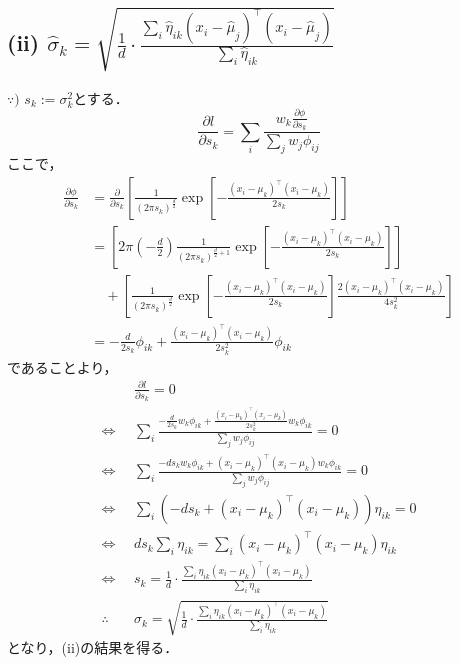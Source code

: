 \documentclass[11pt,a4paper,dvipdfmx]{article}
\theoremstyle{plain}
\renewcommand{\hat}{\widehat}
\newcommand{\equi}{\Longleftrightarrow}
\newcommand{\1}{\mbox{1}\hspace{-0.25em}\mbox{l}}
\begin{document}
\subsection*{(ii) $\hat{\sigma}_k = \sqrt{\frac{1}{d} \cdot \frac{\sum_i \hat{\eta}_{ik} (x_i - \hat{\mu}_j)^\top (x_i - \hat{\mu}_j)}{\sum_i \hat{\eta}_{ik}}}$}
$\because)$
$s_k := \sigma_k^2$とする．
\begin{equation*}
	\frac{\partial l}{\partial s_k} = \sum_i
	\frac{w_k \frac{\partial \phi}{\partial s_k}}{\sum_j w_j \phi_{ij}}
\end{equation*}
ここで，
\begin{align*}
	\frac{\partial \phi}{\partial s_k}
	&= \frac{\partial}{\partial s_k} \left[
	\frac{1}{(2 \pi s_k)^{\frac{d}{2}}} \exp \left[ - \frac{(x_i - \mu_k)^\top (x_i - \mu_k)}{2 s_k} \right]
	\right] \\
	&= \left[ 2 \pi \left( -\frac{d}{2}\right)
	\frac{1}{(2 \pi s_k)^{\frac{d}{2} + 1}} \exp \left[ - \frac{(x_i - \mu_k)^\top (x_i - \mu_k)}{2 s_k} \right]
	\right] \\
	& \quad + 
	\left[
	\frac{1}{(2 \pi s_k)^{\frac{d}{2}}} \exp \left[ - \frac{(x_i - \mu_k)^\top (x_i - \mu_k)}{2 s_k} \right] \frac{2(x_i - \mu_k)^\top (x_i - \mu_k)}{4 s_k^2}
	\right]
	\nonumber \\
	&= - \frac{d}{2s_k}\phi_{ik} + \frac{(x_i - \mu_k)^\top (x_i - \mu_k)}{2 s_k^2} \phi_{ik}
\end{align*}
であることより，
\begin{align*}
	&\frac{\partial l}{\partial s_k} = 0 \\
	\equi &\sum_i \frac{- \frac{d}{2s_k}w_k \phi_{ik} + \frac{(x_i - \mu_k)^\top (x_i - \mu_k)}{2 s_k^2} w_k \phi_{ik}}{\sum_j w_j \phi_{ij}} = 0 \\
	\equi &\sum_i \frac{- d s_k w_k \phi_{ik} + (x_i - \mu_k)^\top (x_i - \mu_k) w_k \phi_{ik}}{\sum_j w_j \phi_{ij}} = 0 \\
	\equi &\sum_i (- d s_k + (x_i - \mu_k)^\top (x_i - \mu_k)) \eta_{ik} = 0 \\
	\equi &d s_k \sum_i \eta_{ik} = \sum_i (x_i - \mu_k)^\top (x_i - \mu_k) \eta_{ik} \\
	\equi &s_k = \frac{1}{d} \cdot \frac{\sum_i \eta_{ik} (x_i - \mu_k)^\top (x_i - \mu_k)}{\sum_i \eta_{ik}} \\
	\therefore \quad & \sigma_k = \sqrt{\frac{1}{d} \cdot \frac{\sum_i \eta_{ik} (x_i - \mu_k)^\top (x_i - \mu_k)}{\sum_i \eta_{ik}}}
\end{align*}
となり，(ii)の結果を得る．
\end{document}
